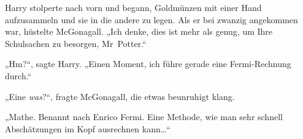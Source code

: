 

Harry stolperte nach vorn und begann, Goldmünzen mit einer Hand aufzusammeln und sie in die andere zu legen. Als er bei zwanzig angekommen war, hüstelte McGonagall. „Ich denke, dies ist mehr als genug, um Ihre Schulsachen zu besorgen, Mr~Potter.“

„Hm?“, sagte Harry. „Einen Moment, ich führe gerade eine Fermi-Rechnung durch.“

„Eine \emph{was}?“, fragte McGonagall, die etwas beunruhigt klang.

„Mathe. Benannt nach Enrico Fermi. Eine Methode, wie man sehr schnell Abschätzungen im Kopf ausrechnen kann…“

